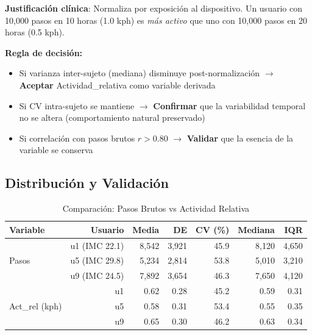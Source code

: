 \documentclass[12pt,letterpaper,twoside]{report}
\begin{document}
\begin{calculobox}
\begin{estadisticobox}
\textbf{Justificación clínica}: Normaliza por exposición al dispositivo. Un usuario con 10,000 pasos en 10 horas (1.0 kph) es \textit{más activo} que uno con 10,000 pasos en 20 horas (0.5 kph).
\end{estadisticobox}

\begin{reglabox}
\textbf{Regla de decisión:}

\begin{itemize}[noitemsep]
    \item Si varianza inter-sujeto (mediana) disminuye post-normalización $\to$ \textbf{Aceptar} Actividad\_relativa como variable derivada
    \item Si CV intra-sujeto se mantiene $\to$ \textbf{Confirmar} que la variabilidad temporal no se altera (comportamiento natural preservado)
    \item Si correlación con pasos brutos $r > 0.80$ $\to$ \textbf{Validar} que la esencia de la variable se conserva
\end{itemize}
\end{reglabox}

\subsection{Distribución y Validación}

\begin{table}[H]
\centering
\caption{Comparación: Pasos Brutos vs Actividad Relativa}
\label{tab:activity_comparison}
\begin{tabular}{@{}lrrrrrr@{}}
\toprule
\textbf{Variable} & \textbf{Usuario} & \textbf{Media} & \textbf{DE} & \textbf{CV (\%)} & \textbf{Mediana} & \textbf{IQR} \\
\midrule
\multirow{3}{*}{Pasos} 
    & u1 (IMC 22.1) & 8,542 & 3,921 & 45.9 & 8,120 & 4,650 \\
    & u5 (IMC 29.8) & 5,234 & 2,814 & 53.8 & 5,010 & 3,210 \\
    & u9 (IMC 24.5) & 7,892 & 3,654 & 46.3 & 7,650 & 4,120 \\
\midrule
\multirow{3}{*}{Act\_rel (kph)} 
    & u1 & 0.62 & 0.28 & 45.2 & 0.59 & 0.31 \\
    & u5 & 0.58 & 0.31 & 53.4 & 0.55 & 0.35 \\
    & u9 & 0.65 & 0.30 & 46.2 & 0.63 & 0.34 \\
\bottomrule
\end{tabular}
\end{table}


\end{calculobox}
\end{document}
